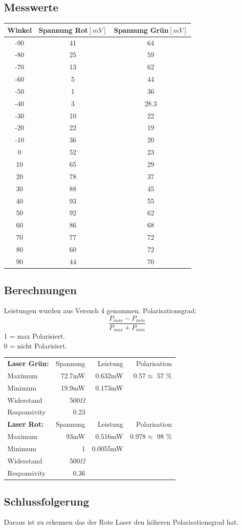 \documentclass{article}
\begin{document}
\subsection{Messwerte}
\begin{tabular}{|c|c|c|}
	\hline 
	\textbf{Winkel}& \textbf{Spannung Rot$[mV]$} &\textbf{Spannung Grün$[mV]$}  \\ 
	\hline 
	-90& 41 & 64 \\ 
	\hline 
	-80& 25 &  59\\ 
	\hline 
	-70& 13 &  62\\ 
	\hline 
	-60&  5& 44 \\ 
	\hline 
	-50& 1 & 36 \\ 
	\hline 
	-40& 3 &  28.3\\ 
	\hline 
	-30&  10&22  \\ 
	\hline 
	-20& 22 & 19 \\ 
	\hline 
	-10& 36 & 20 \\ 
	\hline 
	0& 52 &23  \\ 
	\hline 
	10&  65& 29 \\ 
	\hline 
	20& 78 & 37 \\ 
	\hline 
	30& 88 & 45 \\ 
	\hline 
	40& 93 &  55\\ 
	\hline 
	50&  92&  62\\ 
	\hline 
	60& 86 & 68 \\ 
	\hline 
	70& 77 &  72\\ 
	\hline 
	80&  60& 72 \\ 
	\hline 
	90& 44 &  70\\ 
	\hline 
\end{tabular} 
\subsection{Berechnungen}
Leistungen wurden aus Versuch 4 genommen.
Polarisationsgrad:
\begin{equation}
	\frac{P_{max}-P_{min}}{P_{max}+P_{min}}
\end{equation}
1 = max Polarisiert.\\
0 = nicht Polarisiert.

\begin{tabular}{l  r r r}
	\textbf{Laser Grün:}&Spannung&Leistung&Polarisation\\
	Maximum &72.7mW& 0.632mW&0.57$\approx$ 57 \%\\
	Minimum &19.9mW& 0.173mW&\\
	Widerstand&500$\Omega$&&\\
	Responsivity&0.23&&\\
\textbf{Laser Rot:}&Spannung&Leistung&Polarisation\\
Maximum &93mW& 0.516mW&0.978$\approx$ 98 \%\\
Minimum &1& 0.0055mW&\\
Widerstand&500$\Omega$&&\\
Responsivity&0.36&&\\
\end{tabular}
\subsection{Schlussfolgerung}
Daraus ist zu erkennen das der Rote Laser den höheren Polarisationsgrad hat.
\end{document}
